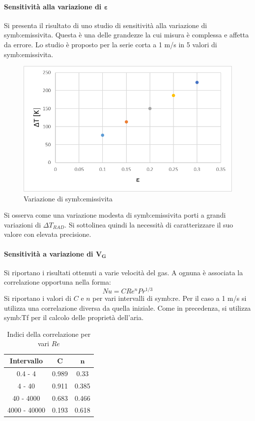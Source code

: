 \paragraph{Sensitività alla variazione di $\bm{\varepsilon}$}
Si presenta il risultato di uno studio di sensitività alla variazione di \gls{symb:emissivita}. Questa è una delle grandezze la cui misura è complessa e affetta da errore. Lo studio è proposto per la serie corta a 1 m/s in 5 valori di \gls{symb:emissivita}.

\begin{figure} [H]
	\centering
	\includegraphics[width=0.7\linewidth]{"../sperimentazione nei propulsori/varepsilon"}
	\caption{Variazione di \gls{symb:emissivita}}
	\label{fig:variazioneepsilon}
\end{figure}

Si osserva come una variazione modesta di \gls{symb:emissivita} porti a grandi variazioni di $\Delta T_{\textit{RAD}}$. Si sottolinea quindi la necessità di caratterizzare il suo valore con elevata precisione.

\paragraph{Sensitività a variazione di $\bm{V_G}$}
Si riportano i risultati ottenuti a varie velocità del gas. A ognuna è associata la correlazione opportuna nella forma:
\begin{equation}
	Nu = C Re^{n}Pr^{1/3}
\end{equation}
Si riportano i valori di $C$ e $n$ per vari intervalli di \gls{symb:re}. Per il caso a 1 m/s si utilizza una correlazione diversa da quella iniziale. Come in precedenza, si utilizza \gls{symb:Tf} per il calcolo delle proprietà dell'aria.

\begin{table}[H]
	\centering
	\begin{tabular}{c|c|c}
		\toprule
		\toprule
		\textbf{Intervallo}&  $\bm{C}$ &  $\bm{n}$\\
		\midrule
		\midrule
		0.4 - 4 & 0.989 & 0.33\\
		\midrule
		4 - 40 & 0.911 &0.385\\
		\midrule
		40 - 4000 & 0.683 &0.466\\
		\midrule
		4000 - 40000 & 0.193 &0.618\\
		\bottomrule
		\bottomrule	
	\end{tabular}
	\caption{Indici della correlazione per vari $Re$}
	\label{tab:RErange}
\end{table}

